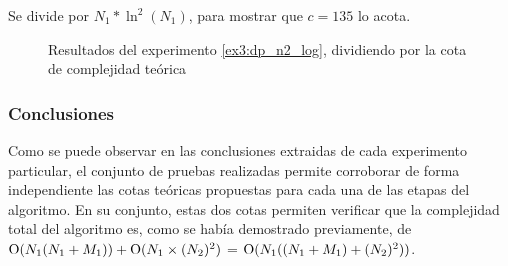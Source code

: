 Se divide por $N_1 * \ln^2(N_1)$, para mostrar que $c = 135$ lo acota.

\begin{figure}[H]
    \centering
    \caption{Resultados del experimento \ref{ex3:dp_n2_log},
    dividiendo por la cota de complejidad teórica}
    \label{fig:exp3:var-nym-base}
\end{figure}

\subsubsection{Conclusiones}

Como se puede observar en las conclusiones extraidas de cada experimento
particular, el conjunto de pruebas realizadas permite corroborar de forma
independiente las cotas teóricas propuestas para cada una de las etapas del
algoritmo. En su conjunto, estas dos cotas permiten verificar que la
complejidad total del algoritmo es, como se había demostrado previamente, de
$\operatorname{O}(N_1(N_1 + M_1)) + \operatorname{O}(N_1 \times (N_2)^2 )$ = $\operatorname{O}(N_1((N_1 + M_1)
+ (N_2)^2))$.




















